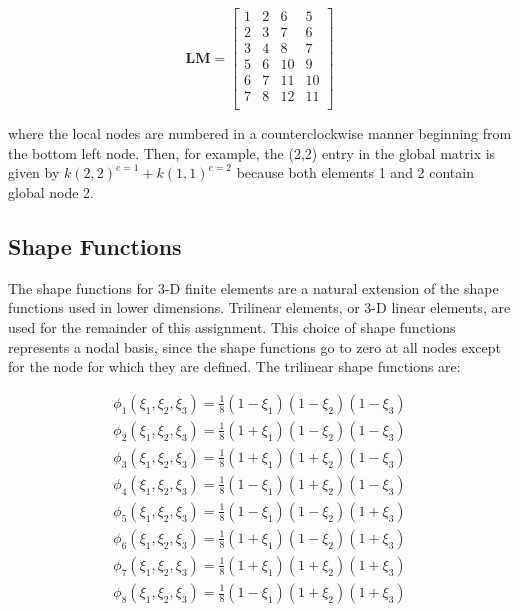 \documentclass[10pt]{article}
\begin{document}
\begin{equation}
\textbf{LM}=\begin{bmatrix}
1 & 2 & 6 & 5\\
2 & 3 & 7 & 6\\
3 & 4 & 8 & 7\\
5 & 6 & 10 & 9\\
6 & 7 & 11 & 10\\
7 & 8 & 12 & 11\\\end{bmatrix}
\end{equation}

where the local nodes are numbered in a counterclockwise manner beginning from the bottom left node. Then, for example, the (2,2) entry in the global matrix is given by \(k(2,2)^{e=1}+k(1,1)^{e=2}\) because both elements 1 and 2 contain global node 2.





\subsection{Shape Functions}

The shape functions for 3-D finite elements are a natural extension of the shape functions used in lower dimensions. Trilinear elements, or 3-D linear elements, are used for the remainder of this assignment. This choice of shape functions represents a nodal basis, since the shape functions go to zero at all nodes except for the node for which they are defined. The trilinear shape functions are:

\begin{equation}
\begin{aligned}
\phi_1(\xi_1,\xi_2,\xi_3)=\frac{1}{8}(1-\xi_1)(1-\xi_2)(1-\xi_3)\\
\phi_2(\xi_1,\xi_2,\xi_3)=\frac{1}{8}(1+\xi_1)(1-\xi_2)(1-\xi_3)\\
\phi_3(\xi_1,\xi_2,\xi_3)=\frac{1}{8}(1+\xi_1)(1+\xi_2)(1-\xi_3)\\
\phi_4(\xi_1,\xi_2,\xi_3)=\frac{1}{8}(1-\xi_1)(1+\xi_2)(1-\xi_3)\\
\phi_5(\xi_1,\xi_2,\xi_3)=\frac{1}{8}(1-\xi_1)(1-\xi_2)(1+\xi_3)\\
\phi_6(\xi_1,\xi_2,\xi_3)=\frac{1}{8}(1+\xi_1)(1-\xi_2)(1+\xi_3)\\
\phi_7(\xi_1,\xi_2,\xi_3)=\frac{1}{8}(1+\xi_1)(1+\xi_2)(1+\xi_3)\\
\phi_8(\xi_1,\xi_2,\xi_3)=\frac{1}{8}(1-\xi_1)(1+\xi_2)(1+\xi_3)\\
\end{aligned}
\end{equation}
\end{document}
